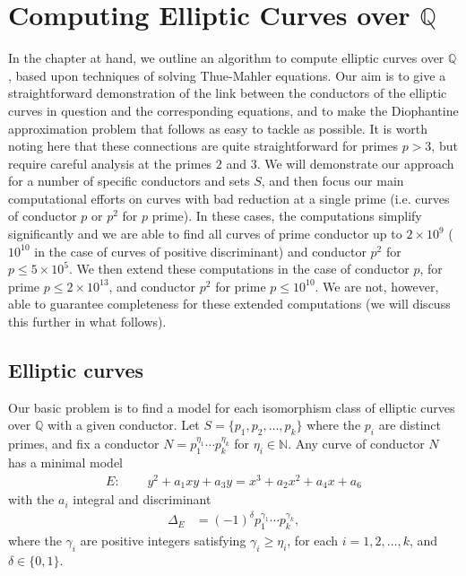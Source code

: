 
\chapter{Computing Elliptic Curves over $\mathbb{Q}$}
\label{ch:EllipticCurves} 

In the chapter at hand, we outline an algorithm to compute elliptic curves over $\mathbb{Q}$, based upon techniques of solving Thue-Mahler equations. Our aim is to give a straightforward demonstration of the link 
between the conductors of the elliptic curves in question and the corresponding equations, and to make the Diophantine approximation problem 
that follows as easy to tackle as possible. It is worth noting here that these connections are quite straightforward for primes $p > 3$, but require 
careful analysis at the primes $2$ and $3$. We will demonstrate our approach for a number of specific conductors and sets $S$, and then focus 
our main computational efforts on curves with bad reduction at a single prime (i.e. curves of conductor $p$ or $p^2$ for 
$p$ prime).  In these cases, the computations simplify significantly and we 
are able to find all curves of prime conductor up to $2 \times 10^9$ ($10^{10}$ in the case of curves of positive 
discriminant) and conductor $p^2$ for $p \leq 5\times 10^5$. We then extend these computations in the case of conductor 
$p$,  for prime $p \leq 2 \times 10^{13}$, and conductor $p^2$ for prime $p \leq 10^{10}$. We are not, however, able to 
guarantee completeness for these extended computations (we will discuss this further in what follows). 



\section{Elliptic curves} \label{elliptic}

Our basic problem is to find a model for each isomorphism class of elliptic curves over $\mathbb{Q}$ with a given 
conductor. Let $S=\{ p_1, p_2, \ldots, p_k \}$ where the $p_i$ are distinct primes, and fix a conductor $N= p_1^{\eta_1} \cdots p_k^{\eta_k}$ for
$\eta_i \in \mathbb{N}$.  Any curve of conductor $N$ has a minimal 
model
\begin{align*}
E:&\phantom{=} y^2 + a_1 xy + a_3 y = x^3 + a_2 x^2 + a_4 x + a_6
\end{align*}
with the $a_i$ integral and discriminant 
\begin{align*}
\Delta_E &= (-1)^\delta p_1^{\gamma_1} \cdots p_k^{\gamma_k},
\end{align*}
where the $\gamma_i$ are positive integers satisfying $\gamma_i \geq \eta_i$, for each $i = 1, 2, \ldots, k$, and $\delta \in \{ 0, 1 \}$. 

